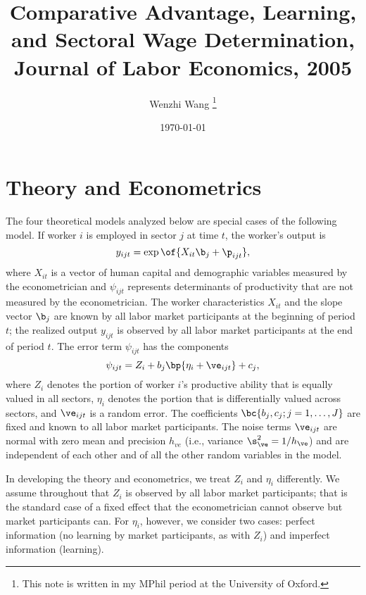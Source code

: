 \documentclass[12pt]{article}
\theoremstyle{definition}
\begin{document}

\title{\bf Comparative Advantage, Learning, and Sectoral Wage Determination, Journal of Labor Economics, 2005}
\author{Wenzhi Wang \thanks{This note is written in my MPhil period at the University of Oxford.} } 
\date{\today}
\maketitle

\citet{gibbons2005}

\section{Theory and Econometrics}

The four theoretical models analyzed below are special cases of the following model. If worker $i$ is employed in sector $j$ at time $t$, the worker's output is 
\begin{equation}
    \label{1}
    y_{ijt} = \exp\of{X_{it} \b_j + \p_{ijt}},
\end{equation}
where $X_{it}$ is a vector of human capital and demographic variables measured by the econometrician and $\psi_{ijt}$ represents determinants of productivity that are not measured by the econometrician. The worker characteristics $X_{it}$ and the slope vector $\b_j$ are known by all labor market participants at the beginning of period $t$; the realized output $y_{ijt}$ is observed by all labor market participants at the end of period $t$. The error term $\psi_{ijt}$ has the components
\begin{equation}
    \label{2}
    \psi_{ijt} = Z_i + b_j \bp{\eta_i + \ve_{ijt}} + c_j,
\end{equation}
where $Z_i$ denotes the portion of worker $i$'s productive ability that is equally valued in all sectors, $\eta_i$ denotes the portion that is differentially valued across sectors, and $\ve_{ijt}$ is a random error. The coefficients $\bc{b_j, c_j; j = 1, \ldots, J}$ are fixed and known to all labor market participants. The noise terms $\ve_{ijt}$ are normal with zero mean and precision $h_{ve}$ (i.e., variance $\s_{\ve}^2 = 1/h_\ve$) and are independent of each other and of all the other random variables in the model. 

In developing the theory and econometrics, we treat $Z_i$ and $\eta_i$ differently. We assume throughout that $Z_i$ is observed by all labor market participants; that is the standard case of a fixed effect that the econometrician cannot observe but market participants can. For $\eta_i$, however, we consider two cases: perfect information (no learning by market participants, as with $Z_i$) and imperfect information (learning). 
\end{document}

